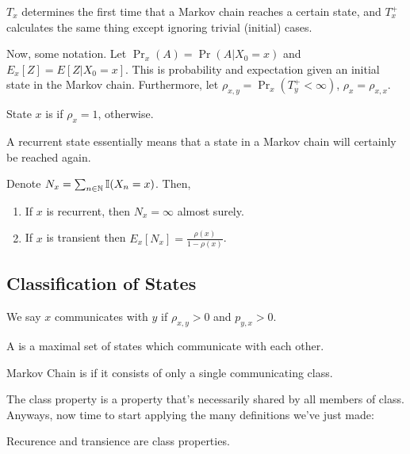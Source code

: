 \documentclass{article}
\begin{document}
$T_x$ determines the first time that a Markov chain reaches a certain state, and $T_x^+$ calculates the same thing except ignoring trivial (initial) cases.

Now, some notation.
Let $\Pr_x(A) = \Pr(A | X_0 = x)$ and $E_x[Z] = E[Z | X_0 = x]$. This is probability and expectation given an initial state in the Markov chain. Furthermore, let $\rho_{x, y} = \Pr_x(T_y^+ < \infty)$, $\rho_x = \rho_{x, x}$. 

\begin{definition}
	State $x$ is  if $\rho_x = 1$,  otherwise.

	A recurrent state essentially means that a state in a Markov chain will certainly be reached again.
\end{definition}

\begin{proposition}
	Denote $N_x = \sum_{n \in \mathbb N} \mathbb{I}(X_n = x)$. Then, 
	\begin{enumerate}
		\item If $x$ is recurrent, then $N_x = \infty$ almost surely.
		\item If $x$ is transient then $E_x[N_x] = \frac{\rho(x)}{1 - \rho(x)}$. 
	\end{enumerate}
\end{proposition}

\subsection{Classification of States}
\begin{definition}
We say $x$ communicates with $y$ if $\rho_{x, y} > 0$ and $p_{y, x} > 0$. 

A  is a maximal set of states which communicate with each other.
\end{definition}

\begin{definition}
	Markov Chain is  if it consists of only a single communicating class.  
\end{definition}

The class property is a property that's necessarily shared by all members of class. Anyways, now time to start applying the many definitions we've just made:

\begin{theorem}
	Recurence and transience are class properties.
\end{theorem}
\end{document}
